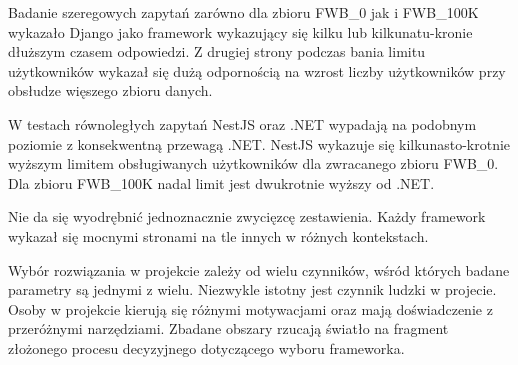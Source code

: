 Badanie szeregowych zapytań zarówno dla zbioru FWB\_0 jak i FWB\_100K wykazało Django jako framework wykazujący się kilku lub kilkunatu-kronie dłuższym czasem odpowiedzi.
Z drugiej strony podczas bania limitu użytkowników wykazał się dużą odpornością na wzrost liczby użytkowników przy obsłudze więszego zbioru danych.

W testach równoległych zapytań NestJS oraz .NET wypadają na podobnym poziomie z konsekwentną przewagą .NET.
NestJS wykazuje się kilkunasto-krotnie wyższym limitem obsługiwanych użytkowników dla zwracanego zbioru FWB\_0.
Dla zbioru FWB\_100K nadal limit jest dwukrotnie wyższy od .NET.

Nie da się wyodrębnić jednoznacznie zwycięzcę zestawienia.
Każdy framework wykazał się mocnymi stronami na tle innych w różnych kontekstach.

Wybór rozwiązania w projekcie zależy od wielu czynników, wśród których badane parametry są jednymi z wielu.
Niezwykle istotny jest czynnik ludzki w projecie.
Osoby w projekcie kierują się różnymi motywacjami oraz mają doświadczenie z przeróżnymi narzędziami.
Zbadane obszary rzucają światło na fragment złożonego procesu decyzyjnego dotyczącego wyboru frameworka.